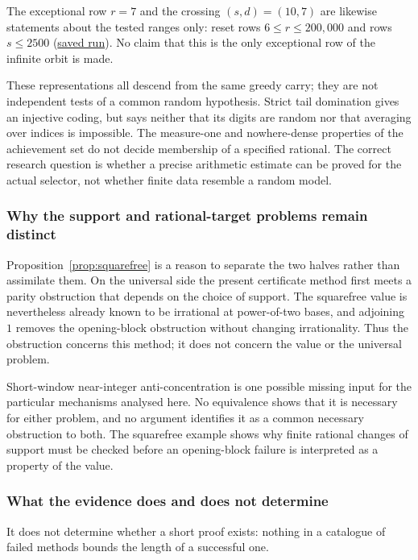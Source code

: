 \documentclass[11pt]{article}
\theoremstyle{plain}
\theoremstyle{definition}
\theoremstyle{remark}
\begin{document}
The exceptional row $r=7$ and the crossing $(s,d)=(10,7)$ are likewise
statements about the tested ranges only: reset rows $6\le r\le200{,}000$
and rows $s\le2500$ (\href{https://github.com/wcook04/plectis-erdos/blob/f757115e03bebe5c04431a147da559015c680a37/research/experiments/erdos257/receipts/seam-reset-crossing-2500.json}{saved run}).  No claim that this is
the only exceptional row of the infinite orbit is made.

These representations all descend from the same greedy carry;
they are not independent tests of a common random hypothesis.  Strict
tail domination gives an injective coding, but says neither that its
digits are random nor that averaging over indices is impossible.  The
measure-one and nowhere-dense properties of the achievement set do not
decide membership of a specified rational.  The correct research question
is whether a precise arithmetic estimate can be proved for the actual
selector, not whether finite data resemble a random model.

\subsubsection*{Why the support and rational-target problems remain distinct}

Proposition~\ref{prop:squarefree} is a reason to separate the two halves
rather than assimilate them.  On the universal side the present
certificate method first meets a parity obstruction that depends on the choice of support.
The squarefree value is nevertheless already known to be irrational at
power-of-two bases, and adjoining $1$ removes the opening-block obstruction
without changing irrationality.  Thus the obstruction concerns this method; it
does not concern the value or the universal problem.

Short-window near-integer anti-concentration is one possible missing
input for the particular mechanisms analysed here.  No equivalence shows
that it is necessary for either problem, and no argument identifies it as
a common necessary obstruction to both.  The squarefree example shows why
finite rational changes of support must be checked before an opening-block
failure is interpreted as a property of the value.

\subsubsection*{What the evidence does and does not determine}

It does not determine whether a short proof exists: nothing in a catalogue of failed methods
bounds the length of a successful one.
\end{document}
